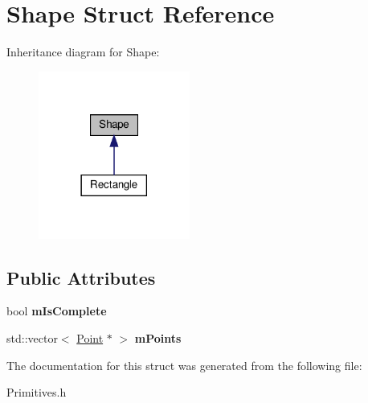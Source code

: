 \hypertarget{structShape}{}\section{Shape Struct Reference}
\label{structShape}


Inheritance diagram for Shape\+:\nopagebreak
\begin{figure}[H]
\begin{center}
\leavevmode
\includegraphics[width=141pt]{structShape__inherit__graph}
\end{center}
\end{figure}
\subsection*{Public Attributes}
\begin{DoxyCompactItemize}
\item 
\mbox{\label{structShape_a5a45763b84f2bd7b7cd6bf58841b612c}} 
bool {\bfseries m\+Is\+Complete}
\item 
\mbox{\label{structShape_a86bf2e7e1c578665974a725dfabf6f5b}} 
std\+::vector$<$ \hyperlink{structPoint}{Point} $\ast$ $>$ {\bfseries m\+Points}
\end{DoxyCompactItemize}


The documentation for this struct was generated from the following file\+:\begin{DoxyCompactItemize}
\item 
Primitives.\+h\end{DoxyCompactItemize}

